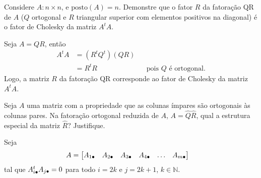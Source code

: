 \begin{questions}
\begin{parts}
\begin{solution}
\begin{center}
            \end{center}
        \end{solution}
    \end{parts}

    \question Considere $A : n \times n$, e $\text{posto}(A) = n$. Demonstre que o fator $R$ da fatora\c{c}\~{a}o QR de $A$ ($Q$ ortogonal e $R$ triangular superior com elementos positivos na diagonal) \'{e} o fator de Cholesky da matriz $A^t A$.
    \begin{solution}
        Seja $A = Q R$, ent\~{a}o
        \begin{align*}
            A^t A &= \left( R^t Q^t \right) \left( Q R \right) \\
            &= R^t R && \text{pois $Q$ \'{e} ortogonal}.
        \end{align*}
        Logo, a matriz $R$ da fatora\c{c}\~{a}o QR corresponde ao fator de Cholesky da matriz $A^t A$.
    \end{solution}

    \question Seja $A$ uma matriz com a propriedade que as colunas \'{i}mpares s\~{a}o ortogonais \`{a}s colunas pares. Na fatora\c{c}\~{a}o ortogonal reduzida de $A$, $A = \hat{Q} \hat{R}$, qual a estrutura especial da matriz $\hat{R}$? Justifique.
    \begin{solution}
        Seja
        \begin{align*}
            A &= \begin{bmatrix}
                A_{1 \bullet} & A_{2 \bullet} & A_{3 \bullet} & A_{4 \bullet} & \ldots & A_{m \bullet}
            \end{bmatrix}
        \end{align*}
        tal que $A_{i \bullet}^t A_{j \bullet} = 0$ para todo $i = 2k$ e $j = 2k + 1$, $k \in \mathbb{N}$.


\end{solution}
\end{questions}
